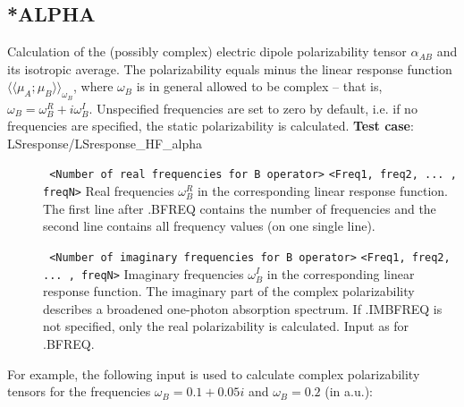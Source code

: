 \subsection{*ALPHA}\label{subsec:alpha}
Calculation of the (possibly complex) 
electric dipole polarizability tensor $\alpha_{AB}$ and its isotropic average.
The polarizability equals minus the linear response function
$\langle\langle \mu_A; \mu_B \rangle\rangle_{\omega_B}$, where
$\omega_B$ is in general allowed to be complex -- that is,
$\omega_B = \omega_B^R + i \omega_B^I$.
Unspecified frequencies are set to zero by default,
i.e. if no frequencies are specified, the static polarizability is calculated.
\newline
{\bf Test case}: LSresponse/LSresponse\_HF\_alpha 
\begin{description}
\item[] \verb| | \newline
\verb|<Number of real frequencies for B operator>|\newline
\verb|<Freq1, freq2, ... , freqN>|\newline
Real frequencies $\omega_B^R$ in the corresponding linear response function.
The first line after .BFREQ contains the number of frequencies
and the second line contains all frequency values (on one single line).
\item[] \verb| | \newline
\verb|<Number of imaginary frequencies for B operator>|\newline
\verb|<Freq1, freq2, ... , freqN>|\newline
Imaginary frequencies $\omega_B^I$ in the corresponding
linear response function.
The imaginary part of the complex polarizability describes a broadened one-photon
absorption spectrum.
If .IMBFREQ is not specified, only the real polarizability is calculated.
Input as for .BFREQ. 
\end{description}
For example, the following input is used 
to calculate complex polarizability tensors
for the frequencies $\omega_B = 0.1 + 0.05i$ and $\omega_B = 0.2$ 
(in a.u.):
\begin{description}
\item[]
\item[]
\item[]
\item[]
\item[]
\item[]
\item[]
\item[]
\end{description}



